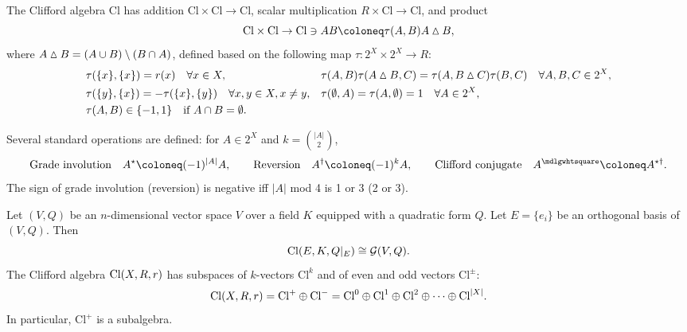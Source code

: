 \documentclass[CheatSheet]{subfiles}
\begin{document}
The Clifford algebra $\mathrm{Cl}$ has
addition $\mathrm{Cl}\times\mathrm{Cl}\to\mathrm{Cl}$,
scalar multiplication $R\times\mathrm{Cl}\to\mathrm{Cl}$, and
product
\begin{equation}
  \mathrm{Cl}\times\mathrm{Cl}\to\mathrm{Cl}\ni AB
  \deq \tau(A,B)A\setdiff B,
\end{equation}
where $A\mathbin{\vartriangle} B=(A\cup B)\setminus(B\cap A)$,
defined based on the following map $\tau\colon2^X\times2^X\to R$:
\begin{equation}
  \begin{split}
  &\tau(\{x\},\{x\}) = r(x)\quad\forall x\in X,&
  &\tau(A,B)\tau(A\mathbin{\vartriangle} B,C)=\tau(A,B\mathbin{\vartriangle} C)\tau(B,C)\quad\forall A,B,C\in 2^X,\\
  &\tau(\{y\},\{x\}) = -\tau(\{x\},\{y\})\quad\forall x,y\in X,x\neq y,&
  &\tau(\emptyset,A)=\tau(A,\emptyset)=1\quad\forall A\in2^X,\\
  &\tau(A,B)\in\{-1,1\}\quad \text{if}~A\cap B=\emptyset.
  \end{split}
\end{equation}

Several standard operations are defined: for $A\in2^X$ and $k=\binom{|A|}{2}$,
\begin{equation}
\text{Grade involution}\quad A^\star\deq(-1)^{|A|}A,\qquad
\text{Reversion}\quad A^\dagger\deq(-1)^{k}A,\qquad
\text{Clifford conjugate}\quad A^\mdlgwhtsquare\deq A^{\star\dagger}.
\end{equation}
The sign of grade involution (reversion) is negative iff $|A|$ mod 4 is 1 or 3 (2 or 3).


Let $(V,Q)$ be an $n$-dimensional vector space $V$ over a field $K$ equipped with a quadratic form $Q$. Let $E=\{e_i\}$ be an orthogonal basis of $(V,Q)$.
Then
\begin{equation}
  \operatorname{\mathrm{Cl}}(E, K, Q|_E) \cong \operatorname{\mathcal{G}}(V,Q).
\end{equation}
The Clifford algebra $\operatorname{\mathrm{Cl}}(X,R,r)$ has subspaces of $k$-vectors $\mathrm{Cl}^k$ and of even and odd vectors $\mathrm{Cl}^\pm$:
\[
\operatorname{\mathrm{Cl}}(X,R,r)=\mathrm{Cl}^+\oplus\mathrm{Cl}^-=
\mathrm{Cl}^0\oplus\mathrm{Cl}^1\oplus\mathrm{Cl}^2\oplus\cdots\oplus\mathrm{Cl}^{|X|}.
\]
In particular, $\mathrm{Cl}^+$ is a subalgebra.
\end{document}

